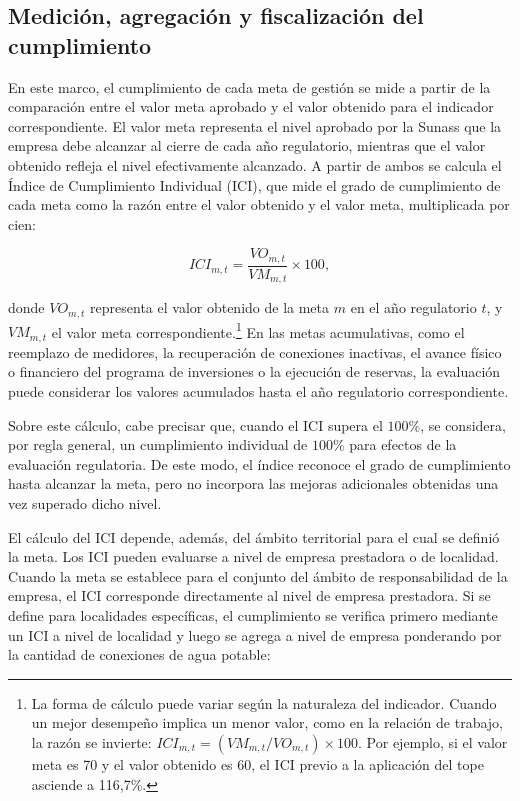 \subsection{Medición, agregación y fiscalización del cumplimiento} 
 
En este marco, el cumplimiento de cada meta de gestión se mide a partir de la comparación entre el valor meta aprobado y el valor obtenido para el indicador correspondiente. El valor meta representa el nivel aprobado por la Sunass que la empresa debe alcanzar al cierre de cada año regulatorio, mientras que el valor obtenido refleja el nivel efectivamente alcanzado. A partir de ambos se calcula el Índice de Cumplimiento Individual (ICI), que mide el grado de cumplimiento de cada meta como la razón entre el valor obtenido y el valor meta, multiplicada por cien: 
 
\begin{equation} 
ICI_{m,t} 
= 
\frac{VO_{m,t}}{VM_{m,t}} 
\times 100, 
\end{equation} 
 
donde \(VO_{m,t}\) representa el valor obtenido de la meta \(m\) en el año regulatorio \(t\), y \(VM_{m,t}\) el valor meta correspondiente.\footnote{La forma de cálculo puede variar según la naturaleza del indicador. Cuando un mejor desempeño implica un menor valor, como en la relación de trabajo, la razón se invierte: \(ICI_{m,t}=(VM_{m,t}/VO_{m,t})\times100\). Por ejemplo, si el valor meta es 70 y el valor obtenido es 60, el ICI previo a la aplicación del tope asciende a 116,7\%.} En las metas acumulativas, como el reemplazo de medidores, la recuperación de conexiones inactivas, el avance físico o financiero del programa de inversiones o la ejecución de reservas, la evaluación puede considerar los valores acumulados hasta el año regulatorio correspondiente. 
 
Sobre este cálculo, cabe precisar que, cuando el ICI supera el \(100\%\), se considera, por regla general, un cumplimiento individual de \(100\%\) para efectos de la evaluación regulatoria. De este modo, el índice reconoce el grado de cumplimiento hasta alcanzar la meta, pero no incorpora las mejoras adicionales obtenidas una vez superado dicho nivel. 
 
El cálculo del ICI depende, además, del ámbito territorial para el cual se definió la meta. Los ICI pueden evaluarse a nivel de empresa prestadora o de localidad. Cuando la meta se establece para el conjunto del ámbito de responsabilidad de la empresa, el ICI corresponde directamente al nivel de empresa prestadora. Si se define para localidades específicas, el cumplimiento se verifica primero mediante un ICI a nivel de localidad y luego se agrega a nivel de empresa ponderando por la cantidad de conexiones de agua potable: 
 
